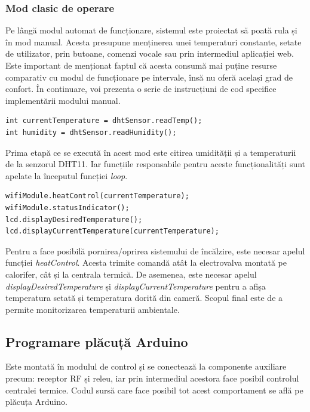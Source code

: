 \subsubsection{Mod clasic de operare}

	Pe lângă modul automat de funcționare, sistemul este proiectat să poată rula și în mod manual. Acesta presupune menținerea unei temperaturi constante, setate de utilizator, prin butoane, comenzi vocale sau prin intermediul aplicației web. Este important de menționat faptul că acesta consumă mai puține resurse comparativ cu modul de funcționare pe intervale, însă nu oferă același grad de confort. În continuare, voi prezenta o serie de instrucțiuni de cod specifice implementării modului manual.

\vspace{1em}
\begin{lstlisting}
int currentTemperature = dhtSensor.readTemp();
int humidity = dhtSensor.readHumidity();
\end{lstlisting}
\vspace{2em}	

	Prima etapă ce se execută în acest mod este citirea umidității și a temperaturii de la senzorul DHT11. Iar funcțiile responsabile pentru aceste funcționalități sunt apelate la începutul funcției \textit{loop}.

\vspace{1em}
\begin{lstlisting}
wifiModule.heatControl(currentTemperature); 
wifiModule.statusIndicator();
lcd.displayDesiredTemperature();
lcd.displayCurrentTemperature(currentTemperature);
\end{lstlisting}
\vspace{2em}	

	Pentru a face posibilă pornirea/oprirea sistemului de încălzire, este necesar apelul funcției \textit{heatControl}. Acesta trimite comandă atât la electrovalva montată pe calorifer, cât și la centrala termică. De asemenea, este necesar apelul \textit{displayDesiredTemperature} și \textit{displayCurrentTemperature} pentru a afișa temperatura setată și temperatura dorită din cameră. Scopul final este de a permite monitorizarea temperaturii ambientale.

\subsection{Programare plăcuță Arduino}

	Este montată în modulul de control și se conectează la componente auxiliare precum: receptor RF și releu, iar prin intermediul acestora face posibil controlul centralei termice. Codul sursă care face posibil tot acest comportament se află pe plăcuța Arduino. 

